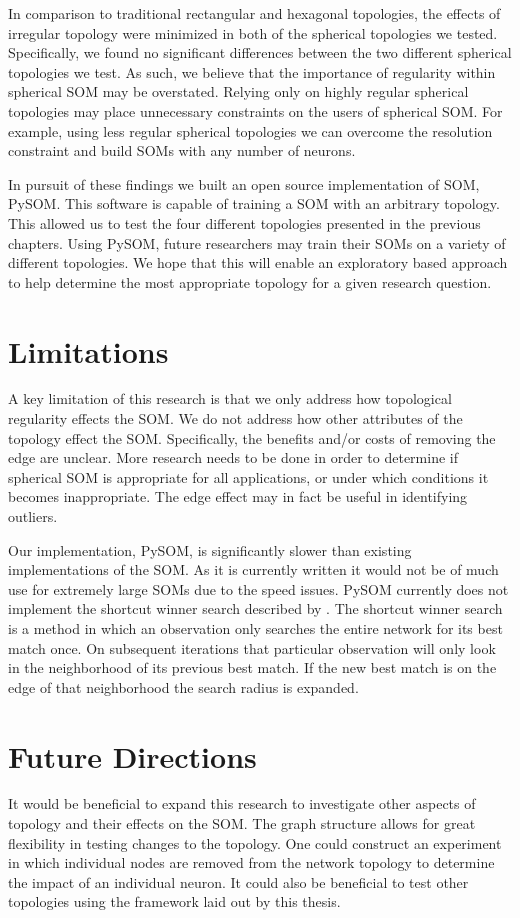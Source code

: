 In comparison to traditional rectangular and hexagonal topologies, the effects
of irregular topology were minimized in both of the spherical
topologies we tested.  Specifically, we found no significant differences
between the two different spherical topologies we test.  As such, we believe
that the importance of regularity within spherical SOM may be overstated.
Relying only on highly regular spherical topologies may place
unnecessary constraints on the users of spherical SOM.  For example, using less
regular spherical topologies we can overcome the resolution constraint and build
SOMs with any number of neurons.

In pursuit of these findings we built an open source implementation of SOM,
PySOM. This software is capable of training a SOM with an arbitrary
topology.  This allowed us to test the four different topologies presented in
the previous chapters.  Using PySOM, future researchers may train their
SOMs on a variety of different topologies.  We hope that this will enable an
exploratory based approach to help determine the most appropriate topology for
a given research question.


\section{Limitations}
A key limitation of this research is that we only address how topological
regularity effects the SOM.  We do not address how other attributes of the
topology effect the SOM. Specifically, the benefits and/or costs of removing the
edge are unclear.  More research needs to be done in order to determine if spherical SOM
is appropriate for all applications, or under which conditions it becomes
inappropriate.  The edge effect may in fact be useful in identifying outliers.

Our implementation, PySOM, is significantly slower than existing implementations
of the SOM.  As it is currently written it would not be of much use for
extremely large SOMs due to the speed issues.  PySOM currently does not
implement the shortcut winner search described by \cite{Kohonen2000}.  The
shortcut winner search is a method in which an observation only searches the entire
network for its best match once.  On subsequent iterations that particular
observation will only look in the neighborhood of its previous best match. If
the new best match is on the edge of that neighborhood the search radius is
expanded.


\section{Future Directions}
It would be beneficial to expand this research to investigate other aspects of
topology and their effects on the SOM.  The graph structure allows for great
flexibility in testing changes to the topology.  One could construct an
experiment in which individual nodes are removed from the network topology to
determine the impact of an individual neuron.  It could also be beneficial to
test other topologies using the framework laid out by this thesis.

